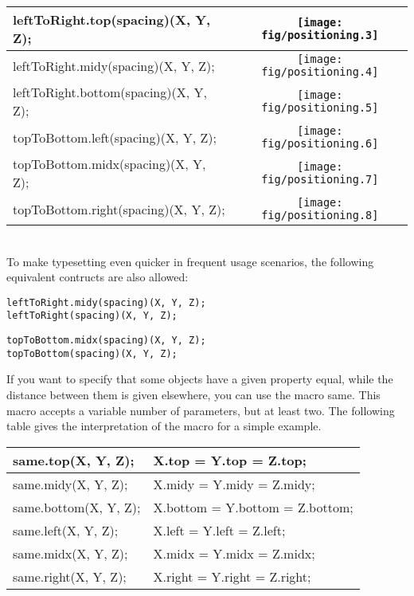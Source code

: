 \documentclass{article}
\newcommand{\code}{\ttfamily}
\begin{document}
\begin{tabular}{||l|c||}
\hline
{\code leftToRight.top(spacing)(X, Y, Z);} & \texttt{[image: fig/positioning.3]} \\
\hline
{\code leftToRight.midy(spacing)(X, Y, Z);} & \texttt{[image: fig/positioning.4]} \\
\hline
{\code leftToRight.bottom(spacing)(X, Y, Z);} & \texttt{[image: fig/positioning.5]} \\
\hline
{\code topToBottom.left(spacing)(X, Y, Z);} & \texttt{[image: fig/positioning.6]} \\
\hline
{\code topToBottom.midx(spacing)(X, Y, Z);} & \texttt{[image: fig/positioning.7]} \\
\hline
{\code topToBottom.right(spacing)(X, Y, Z);} & \texttt{[image: fig/positioning.8]} \\
\hline
\end{tabular} \\

To make typesetting even quicker in frequent usage scenarios, the following equivalent contructs are also allowed:

\begin{verbatim}
leftToRight.midy(spacing)(X, Y, Z);
leftToRight(spacing)(X, Y, Z);
\end{verbatim}

\begin{verbatim}
topToBottom.midx(spacing)(X, Y, Z);
topToBottom(spacing)(X, Y, Z);
\end{verbatim}

If you want to specify that some objects have a given property equal, while the distance between them is given elsewhere, you can use the macro {\code same}.
This macro accepts a variable number of parameters, but at least two. The following table gives the interpretation of the macro for a simple example.

\begin{tabular}{||l|l||}
\hline
{\code same.top(X, Y, Z);} & {\code X.top = Y.top = Z.top;} \\
\hline
{\code same.midy(X, Y, Z);} & {\code X.midy = Y.midy = Z.midy;} \\
\hline
{\code same.bottom(X, Y, Z);} & {\code X.bottom = Y.bottom = Z.bottom;} \\
\hline
{\code same.left(X, Y, Z);} & {\code X.left = Y.left = Z.left;} \\
\hline
{\code same.midx(X, Y, Z);} & {\code X.midx = Y.midx = Z.midx;} \\
\hline
{\code same.right(X, Y, Z);} & {\code X.right = Y.right = Z.right;} \\
\hline
\end{tabular} \\
\end{document}
